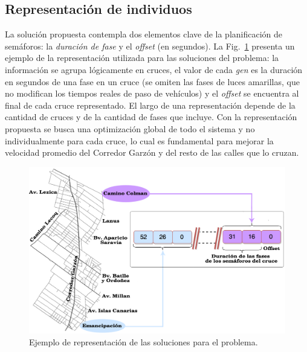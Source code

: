 \subsection{Representación de individuos}


La solución propuesta contempla dos elementos clave de la planificación de semáforos: la \textit{duración de fase} y el \emph{offset} (en segundos). La Fig.~\ref{fig:cromosoma1} presenta un ejemplo de la representación utilizada para las soluciones del problema: la información se agrupa lógicamente en cruces, el valor de cada \textit{gen} es la duración en segundos de una fase en un cruce (se omiten las fases de  luces amarillas, que no modifican los tiempos reales de paso de vehículos) y el \emph{offset} se encuentra al final de cada cruce representado. El largo de una representación depende de la cantidad de cruces y de la cantidad de fases que incluye. Con la representación propuesta se busca una optimización global de todo el sistema y no individualmente para cada cruce, lo cual es fundamental para mejorar la velocidad promedio del Corredor Garzón y del resto de las calles que lo cruzan.

\begin{figure}[!ht]
	\centering
	\includegraphics[width=0.85\linewidth]{Figures/mapa_genoma}
	\caption{Ejemplo de representación de las soluciones para el problema.} 
	\label{fig:cromosoma1}
\end{figure}

